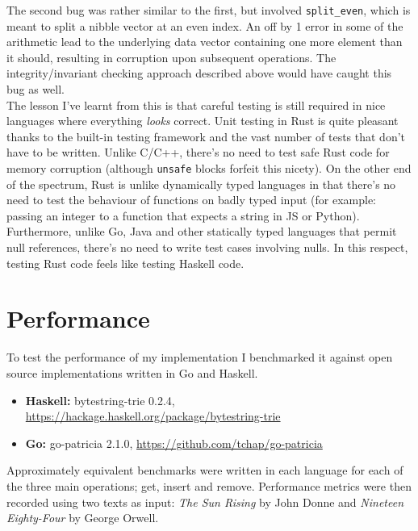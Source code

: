 \documentclass[a4paper,12pt]{article}
\newcommand{\code}[1]{\texttt{#1}}
\begin{document}
The second bug was rather similar to the first, but involved \code{split\_even}, which is meant to split a nibble vector at an even index. An off by 1 error in some of the arithmetic lead to the underlying data vector containing one more element than it should, resulting in corruption upon subsequent operations. The integrity/invariant checking approach described above would have caught this bug as well.\\

The lesson I've learnt from this is that careful testing is still required in nice languages where everything \textit{looks} correct. Unit testing in Rust is quite pleasant thanks to the built-in testing framework and the vast number of tests that don't have to be written. Unlike C/C++, there's no need to test safe Rust code for memory corruption (although \code{unsafe} blocks forfeit this nicety). On the other end of the spectrum, Rust is unlike dynamically typed languages in that there's no need to test the behaviour of functions on badly typed input (for example: passing an integer to a function that expects a string in JS or Python). Furthermore, unlike Go, Java and other statically typed languages that permit null references, there's no need to write test cases involving nulls. In this respect, testing Rust code feels like testing Haskell code.

\section{Performance}

To test the performance of my implementation I benchmarked it against open source implementations written in Go and Haskell.

\begin{itemize}
\item \textbf{Haskell:} bytestring-trie 0.2.4, \url{https://hackage.haskell.org/package/bytestring-trie}
\item \textbf{Go:} go-patricia 2.1.0, \url{https://github.com/tchap/go-patricia}
\end{itemize}

Approximately equivalent benchmarks were written in each language for each of the three main operations; get, insert and remove. Performance metrics were then recorded using two texts as input: \textit{The Sun Rising} by John Donne and \textit{Nineteen Eighty-Four} by George Orwell.\\
\end{document}
